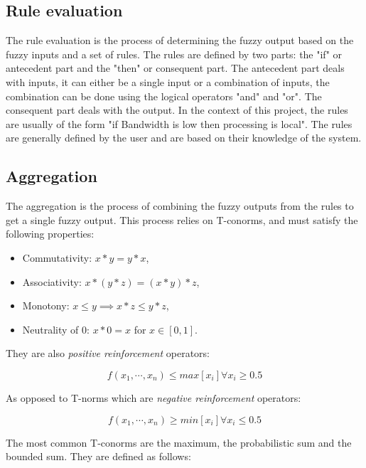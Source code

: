 \subsection{Rule evaluation}
\label{subsec:fuzzy-rule-evaluation}

The rule evaluation is the process of determining the fuzzy output based on the fuzzy inputs and a set of rules. The
rules are defined by two parts: the "if" or antecedent part and the "then" or consequent part. The antecedent part
deals with inputs, it can either be a single input or a combination of inputs, the combination can be done using the
logical operators "and" and "or". The consequent part deals with the output. In the context of this project, the rules
are usually of the form "if Bandwidth is low then processing is local". The rules are generally defined by the user
and are based on their knowledge of the system.

\subsection{Aggregation}
\label{subsec:fuzzy-aggregation}

The aggregation is the process of combining the fuzzy outputs from the rules to get a single fuzzy output. This process
relies on T-conorms, and must satisfy the following properties:

\begin{itemize}
	\item Commutativity: $x * y = y * x$,
	\item Associativity: $x * (y * z) = (x * y) * z$,
	\item Monotony: $x \leq y \implies x * z \leq y * z$,
	\item Neutrality of 0: $x * 0 = x$ for $x \in [0, 1]$.
\end{itemize}

They are also \textit{positive reinforcement} operators:

\begin{equation}
	f(x_1, \cdots, x_n) \leq max[x_i] \forall x_i \geq 0.5
\end{equation}

As opposed to T-norms which are \textit{negative reinforcement} operators:

\begin{equation}
	f(x_1, \cdots, x_n) \geq min[x_i] \forall x_i \leq 0.5
\end{equation}

The most common T-conorms are the maximum, the probabilistic sum and the bounded sum. They are defined as follows:

